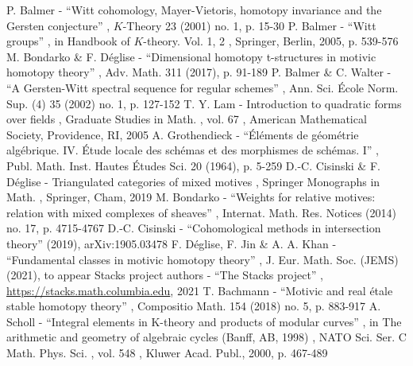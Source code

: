  P. Balmer - “Witt cohomology, Mayer-Vietoris, homotopy invariance and the Gersten conjecture” , $K$-Theory 23 (2001) no. 1, p. 15-30
 P. Balmer - “Witt groups” , in Handbook of $K$-theory. Vol. 1, 2 , Springer, Berlin, 2005, p. 539-576
 M. Bondarko \& F. Déglise - “Dimensional homotopy t-structures in motivic homotopy theory” , Adv. Math. 311 (2017), p. 91-189
 P. Balmer \& C. Walter - “A Gersten-Witt spectral sequence for regular schemes” , Ann. Sci. École Norm. Sup. (4) 35 (2002) no. 1, p. 127-152
 T. Y. Lam - Introduction to quadratic forms over fields , Graduate Studies in Math. , vol. 67 , American Mathematical Society, Providence, RI, 2005
 A. Grothendieck - “Éléments de géométrie algébrique. IV. Étude locale des schémas et des morphismes de schémas. I” , Publ. Math. Inst. Hautes Études Sci. 20 (1964), p. 5-259
 D.-C. Cisinski \& F. Déglise - Triangulated categories of mixed motives , Springer Monographs in Math. , Springer, Cham, 2019
 M. Bondarko - “Weights for relative motives: relation with mixed complexes of sheaves” , Internat. Math. Res. Notices (2014) no. 17, p. 4715-4767
 D.-C. Cisinski - “Cohomological methods in intersection theory” (2019), arXiv:1905.03478
 F. Déglise, F. Jin \& A. A. Khan - “Fundamental classes in motivic homotopy theory” , J. Eur. Math. Soc. (JEMS) (2021), to appear
 Stacks project authors - “The Stacks project” , \url{https://stacks.math.columbia.edu}, 2021
 T. Bachmann - “Motivic and real étale stable homotopy theory” , Compositio Math. 154 (2018) no. 5, p. 883-917
 A. Scholl - “Integral elements in K-theory and products of modular curves” , in The arithmetic and geometry of algebraic cycles (Banff, AB, 1998) , NATO Sci. Ser. C Math. Phys. Sci. , vol. 548 , Kluwer Acad. Publ., 2000, p. 467-489
